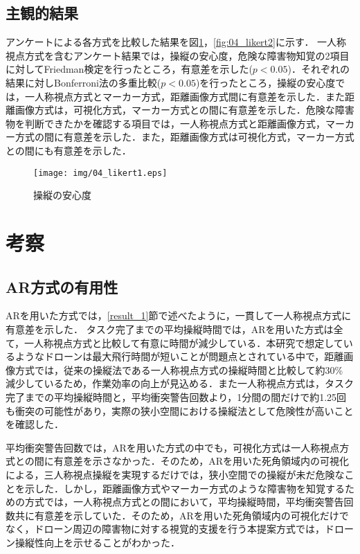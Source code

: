 \documentclass[submit]{ipsj}
\begin{document}
\subsection{主観的結果}
\label{result_2}
アンケートによる各方式を比較した結果を図\ref{fig:04_likert1}，\ref{fig:04_likert2}に示す．
一人称視点方式を含むアンケート結果では，操縦の安心度，危険な障害物知覚の2項目に対してFriedman検定を行ったところ，有意差を示した($p < 0.05$)．それぞれの結果に対しBonferroni法の多重比較($p < 0.05$)を行ったところ，操縦の安心度では，一人称視点方式とマーカー方式，距離画像方式間に有意差を示した．また距離画像方式は，可視化方式，マーカー方式との間に有意差を示した．危険な障害物を判断できたかを確認する項目では，一人称視点方式と距離画像方式，マーカー方式の間に有意差を示した．また，距離画像方式は可視化方式，マーカー方式との間にも有意差を示した．


\begin{figure}[tb]
\centering
\texttt{[image: img/04\_likert1.eps]}
\caption{操縦の安心度}
\label{fig:04_likert1}
\end{figure}




\section{考察}
\subsection{AR方式の有用性}
ARを用いた方式では，\ref{result_1}節で述べたように，一貫して一人称視点方式に有意差を示した．
タスク完了までの平均操縦時間では，ARを用いた方式は全て，一人称視点方式と比較して有意に時間が減少している．本研究で想定しているようなドローンは最大飛行時間が短いことが問題点とされている中で，距離画像方式では，従来の操縦法である一人称視点方式の操縦時間と比較して約30\% 減少しているため，作業効率の向上が見込める．また一人称視点方式は，タスク完了までの平均操縦時間と，平均衝突警告回数より，1分間の間だけで約1.25回も衝突の可能性があり，実際の狭小空間における操縦法として危険性が高いことを確認した．
\par
平均衝突警告回数では，ARを用いた方式の中でも，可視化方式は一人称視点方式との間に有意差を示さなかった．そのため，ARを用いた死角領域内の可視化による，三人称視点操縦を実現するだけでは，狭小空間での操縦が未だ危険なことを示した．しかし，距離画像方式やマーカー方式のような障害物を知覚するための方式では，一人称視点方式との間において，平均操縦時間，平均衝突警告回数共に有意差を示していた．そのため，ARを用いた死角領域内の可視化だけでなく，ドローン周辺の障害物に対する視覚的支援を行う本提案方式では，ドローン操縦性向上を示せることがわかった．
\end{document}
